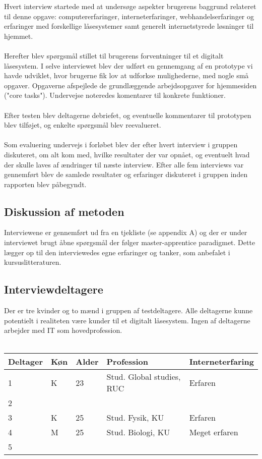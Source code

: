 \documentclass[a4paper,12pt]{article}
\begin{document}
Hvert interview startede med at undersøge aspekter brugerens baggrund relateret til denne opgave:
computererfaringer, interneterfaringer, webhandelserfaringer og erfaringer med forskellige låsesystemer samt generelt internetstyrede løsninger til hjemmet.
\\ \\
Herefter blev spørgsmål stillet til brugerens forventninger til et digitalt låsesystem.
I selve interviewet blev der udført en gennemgang af en prototype vi havde udviklet, hvor brugerne fik lov at udforkse mulighederne, med nogle små opgaver.
Opgaverne afspejlede de grundlæggende arbejdsopgaver for hjemmesiden ("core tasks"). Undervejse noteredes komentarer til konkrete funktioner.
\\ \\
Efter testen blev deltagerne debriefet, og eventuelle kommentarer til prototypen blev tilføjet, og enkelte spørgsmål blev reevalueret.
\\ \\
Som evaluering undervejs i forløbet blev der efter hvert interview i gruppen diskuteret, om alt
kom med, hvilke resultater der var opnået, og eventuelt hvad der skulle laves af ændringer til
næste interview. Efter alle fem interviews var gennemført blev de samlede resultater og erfaringer
diskuteret i gruppen inden rapporten blev påbegyndt.


\subsection{Diskussion af metoden}

Interviewene er gennemført ud fra en tjekliste (se appendix A) og der er under interviewet brugt
åbne spørgsmål der følger master-apprentice paradigmet. Dette lægger op til den interviewedes
egne erfaringer og tanker, som anbefalet i kursuslitteraturen.


\subsection{Interviewdeltagere}

Der er tre kvinder og to mænd i gruppen af testdeltagere. Alle deltagerne kunne potentielt i
realiteten være kunder til et digitalt låsesystem. Ingen af deltagerne arbejder med IT som
hovedprofession.
\\  \\
\begin{tabular}{|l|l|l|l|l|}
	\hline Deltager & Køn & Alder & Profession & Interneterfaring \\
	\hline 1 & K & 23  & Stud. Global studies, RUC & Erfaren \\
	\hline 2 & & & & \\
	\hline 3 & K & 25 & Stud. Fysik, KU & Erfaren \\
	\hline 4 & M & 25 & Stud. Biologi, KU & Meget erfaren \\
	\hline 5 & & & & \\
	\hline
\end{tabular}
\end{document}

